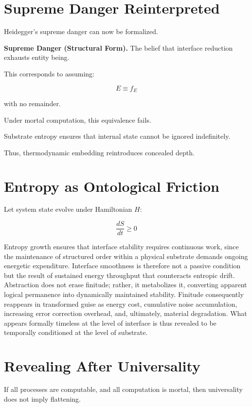 \documentclass[11pt,openany]{book}
\begin{document}
\section{Supreme Danger Reinterpreted}

Heidegger's supreme danger can now be formalized.

\medskip

\textbf{Supreme Danger (Structural Form).}
The belief that interface reduction exhausts entity being.

\medskip

This corresponds to assuming:

\[
E \equiv f_E
\]

with no remainder.

Under mortal computation, this equivalence fails.

Substrate entropy ensures that internal state cannot be ignored indefinitely.

Thus, thermodynamic embedding reintroduces concealed depth.

\section{Entropy as Ontological Friction}

Let system state evolve under Hamiltonian $H$:

\[
\frac{dS}{dt} \geq 0
\]

Entropy growth ensures that interface stability requires continuous work, since the maintenance of structured order within a physical substrate demands ongoing energetic expenditure. Interface smoothness is therefore not a passive condition but the result of sustained energy throughput that counteracts entropic drift. Abstraction does not erase finitude; rather, it metabolizes it, converting apparent logical permanence into dynamically maintained stability. Finitude consequently reappears in transformed guise as energy cost, cumulative noise accumulation, increasing error correction overhead, and, ultimately, material degradation. What appears formally timeless at the level of interface is thus revealed to be temporally conditioned at the level of substrate. 

\section{Revealing After Universality}

If all processes are computable,
and all computation is mortal,
then universality does not imply flattening.
\end{document}
